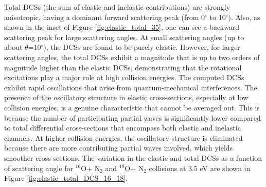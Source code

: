 \documentclass[fleqn,usenatbib]{mnras}
\begin{document}
Total DCSs (the sum of elastic and inelastic contributions) are strongly anisotropic, having a dominant forward scattering peak (from 0$^\circ$ to 10$^\circ$). Also, as shown in the inset of Figure \ref{fig:elastic_total_35}, one can see a backward scattering peak for large scattering angles. At small scattering angles (up to about $\theta$=10$^\circ$), the DCSs are found to be purely elastic. However, for larger scattering angles, the total DCSs exhibit a magnitude that is up to two orders of magnitude higher than the elastic DCSs, demonstrating that the rotational excitations play a major role at high collision energies. The computed DCSs exhibit rapid oscillations that arise from quantum-mechanical interferences. The presence of the oscillatory structure in elastic cross-sections, especially at low collision energies, is a genuine characteristic that cannot be averaged out. This is because the number of participating partial waves is significantly lower compared to total differential cross-sections that encompass both elastic and inelastic channels. At higher collision energies, the oscillatory structure is eliminated because there are more contributing partial waves involved, which yields smoother cross-sections. The variation in the elastic and total DCSs as a function of scattering angle for $^{16}$O+ N$_2$ and $^{18}$O+ N$_2$ collisions at 3.5 eV are shown in Figure \ref{fig:elastic_total_DCS_16_18}.
\end{document}
